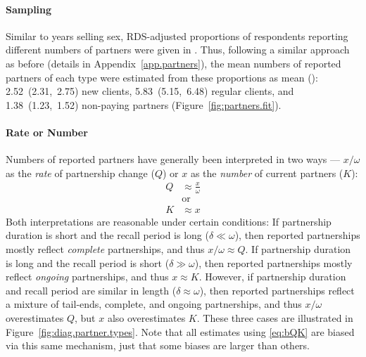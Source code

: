 \paragraph{Sampling}
Similar to years selling sex,
RDS-adjusted proportions of respondents reporting different numbers of partners
were given in \cite{Baral2014}.
Thus, following a similar approach as before (details in Appendix~\ref{app.partners}),
the mean numbers of reported partners of each type
were estimated from these proportions as mean (\ci):
2.52~(2.31,~2.75) new clients,
5.83~(5.15,~6.48) regular clients, and
1.38~(1.23,~1.52) non-paying partners
(Figure~\ref{fig:partners.fit}).
\paragraph[?]{Rate or Number}
Numbers of reported partners have generally been interpreted in two ways ---
$x/\omega$ as the \emph{rate} of partnership change ($Q$) or
$x$ as the \emph{number} of current partners ($K$):
\begin{subequations}\label{eq:bQK}
\begin{alignat}{1}
  Q &\approx \frac{x}{\omega}\\
    &\text{or} \nonumber\\
  K &\approx x
\end{alignat}
\end{subequations}
Both interpretations are reasonable under certain conditions:
If partnership duration is short and the recall period is long ($\delta \ll \omega$),
then reported partnerships mostly reflect \emph{complete} partnerships,
and thus $x/\omega \approx Q$.
If partnership duration is long and the recall period is short ($\delta \gg \omega$),
then reported partnerships mostly reflect \emph{ongoing} partnerships,
and thus $x \approx K$.
However, if partnership duration and recall period are similar in length ($\delta \approx \omega$),
then reported partnerships reflect a mixture of tail-ends, complete, and ongoing partnerships,
and thus $x/\omega$ overestimates $Q$, but $x$ also overestimates $K$.
These three cases are illustrated in Figure~\ref{fig:diag.partner.types}.
Note that all estimates using \eqref{eq:bQK} are biased via this same mechanism,
just that some biases are larger than others.
